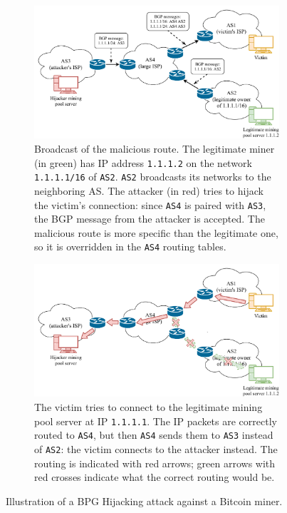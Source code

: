 \begin{figure}[h!]
	\begin{subfigure}{\textwidth}
		\centering
		\vspace*{0.25cm}
		\includegraphics[width=\columnwidth]{figures/bgp_1}
		\vspace*{0.25cm}
		\caption{
			Broadcast of the malicious route.
			The legitimate miner (in green) has IP address \texttt{1.1.1.2} on the network \texttt{1.1.1.1/16} of \texttt{AS2}.
			\texttt{AS2} broadcasts its networks to the neighboring \ac{AS}.
			The attacker (in red) tries to hijack the victim's connection:
			since \texttt{AS4} is paired with \texttt{AS3}, the BGP message from the attacker is accepted.
			The malicious route is more specific than the legitimate one, so it is overridden in the \texttt{AS4} routing tables.
		}
		\vspace*{0.25cm}
	\end{subfigure}
	\begin{subfigure}{\textwidth}
		\centering
		\vspace*{0.25cm}
		\includegraphics[width=\columnwidth]{figures/bgp_2}
		\vspace*{0.25cm}
		\caption{
			The victim tries to connect to the legitimate mining pool server at IP \texttt{1.1.1.1}.
			The IP packets are correctly routed to \texttt{AS4}, but then \texttt{AS4} sends them to \texttt{AS3} instead of \texttt{AS2}:
			the victim connects to the attacker instead.
			The routing is indicated with red arrows;
			green arrows with red crosses indicate what the correct routing would be.
		}
		\vspace*{0.25cm}
	\end{subfigure}
	\caption{Illustration of a BPG Hijacking attack against a Bitcoin miner.}
	\label{fig:bpg-hijacking}
\end{figure}

